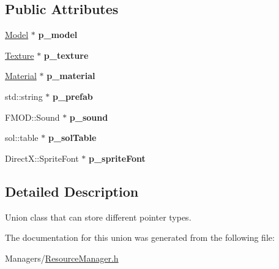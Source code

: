 \subsection*{Public Attributes}
\begin{DoxyCompactItemize}
\item 
\mbox{\label{unionResPtr_ae334bf62d655a0ae6ccaaaa76e055861}} 
\hyperlink{classModel}{Model} $\ast$ {\bfseries p\+\_\+model}
\item 
\mbox{\label{unionResPtr_a3f38dfdd6e45811d1f8382e8a4e2a8e2}} 
\hyperlink{classTexture}{Texture} $\ast$ {\bfseries p\+\_\+texture}
\item 
\mbox{\label{unionResPtr_a8ca4454330a446f38207b6f1a86fec35}} 
\hyperlink{classMaterial}{Material} $\ast$ {\bfseries p\+\_\+material}
\item 
\mbox{\label{unionResPtr_ad7434c0b00397c87f0bcc3a6d0370211}} 
std\+::string $\ast$ {\bfseries p\+\_\+prefab}
\item 
\mbox{\label{unionResPtr_a1a2318cb82c4299265b19379956a9f8b}} 
F\+M\+O\+D\+::\+Sound $\ast$ {\bfseries p\+\_\+sound}
\item 
\mbox{\label{unionResPtr_a1de17a07f3841c5a5ec0d5ff3e6d1174}} 
sol\+::table $\ast$ {\bfseries p\+\_\+sol\+Table}
\item 
\mbox{\label{unionResPtr_a243e018b81d88cfc8b41e4c16c5bc965}} 
Direct\+X\+::\+Sprite\+Font $\ast$ {\bfseries p\+\_\+sprite\+Font}
\end{DoxyCompactItemize}


\subsection{Detailed Description}
Union class that can store different pointer types. 

The documentation for this union was generated from the following file\+:\begin{DoxyCompactItemize}
\item 
Managers/\hyperlink{ResourceManager_8h}{Resource\+Manager.\+h}\end{DoxyCompactItemize}
